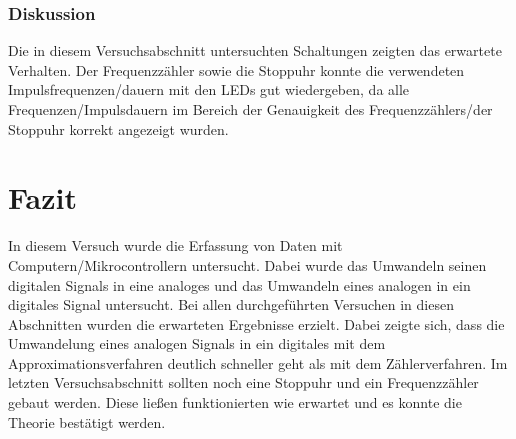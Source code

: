 \documentclass[12pt,a4paper]{article}
\begin{document}
\subsubsection*{Diskussion}
Die in diesem Versuchsabschnitt untersuchten Schaltungen zeigten das erwartete Verhalten. Der Frequenzzähler sowie die Stoppuhr konnte die verwendeten Impulsfrequenzen/dauern mit den LEDs gut wiedergeben, da alle Frequenzen/Impulsdauern im Bereich der Genauigkeit des Frequenzzählers/der Stoppuhr korrekt angezeigt wurden.

\section{Fazit}

In diesem Versuch wurde die Erfassung von Daten mit Computern/Mikrocontrollern untersucht. Dabei wurde das Umwandeln seinen digitalen Signals in eine analoges und das Umwandeln eines analogen in ein digitales Signal untersucht. Bei allen durchgeführten Versuchen in diesen Abschnitten wurden die erwarteten Ergebnisse erzielt. Dabei zeigte sich, dass die Umwandelung eines analogen Signals in ein digitales mit dem Approximationsverfahren deutlich schneller geht als mit dem Zählerverfahren. Im letzten Versuchsabschnitt sollten noch eine Stoppuhr und ein Frequenzzähler gebaut werden. Diese ließen funktionierten wie erwartet und es konnte die Theorie bestätigt werden.
\end{document}
